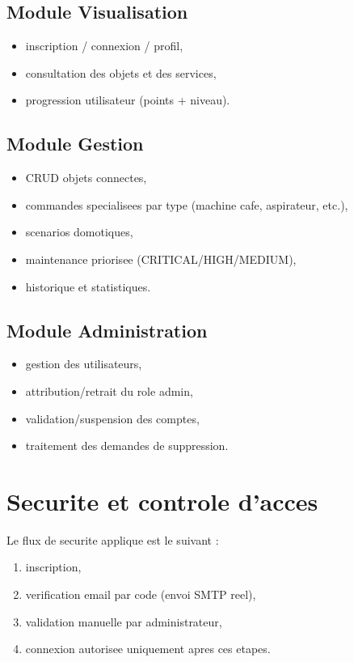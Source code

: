 \documentclass[11pt,a4paper]{article}
\begin{document}
\subsection{Module Visualisation}
\begin{itemize}
  \item inscription / connexion / profil,
  \item consultation des objets et des services,
  \item progression utilisateur (points + niveau).
\end{itemize}

\subsection{Module Gestion}
\begin{itemize}
  \item CRUD objets connectes,
  \item commandes specialisees par type (machine cafe, aspirateur, etc.),
  \item scenarios domotiques,
  \item maintenance priorisee (CRITICAL/HIGH/MEDIUM),
  \item historique et statistiques.
\end{itemize}

\subsection{Module Administration}
\begin{itemize}
  \item gestion des utilisateurs,
  \item attribution/retrait du role admin,
  \item validation/suspension des comptes,
  \item traitement des demandes de suppression.
\end{itemize}

\section{Securite et controle d'acces}

Le flux de securite applique est le suivant :
\begin{enumerate}
  \item inscription,
  \item verification email par code (envoi SMTP reel),
  \item validation manuelle par administrateur,
  \item connexion autorisee uniquement apres ces etapes.
\end{enumerate}
\end{document}
